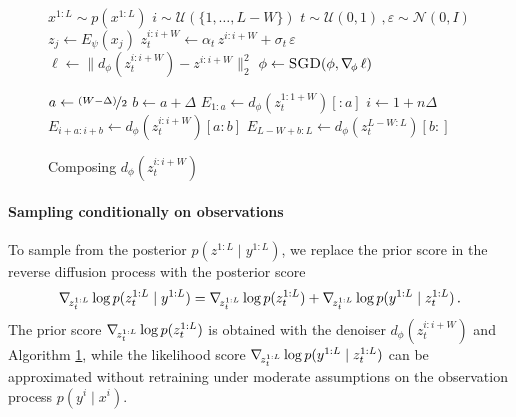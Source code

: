 \begin{figure}[b]
\begin{minipage}[t]{0.49\textwidth}%
\vspace{-1em}
\begin{algorithm}[H]
    \caption{Training $d_\phi(z^{i:i+W}_t)$} \label{alg:appa-training}
    \begin{algorithmic}[1]
            \State $x^{1:L} \sim p(x^{1:L})$
            \State $i \sim \mathcal{U}(\{1, \dots, L-W\})$
            \State $t \sim \mathcal{U}(0, 1) \, , \varepsilon \sim \mathcal{N}(0, I)$
                \State $z_j \gets E_\psi(x_j)$
            \EndFor{}
            \State $z^{i:i+W}_t \gets \alpha_t \, z^{i:i+W} + \sigma_t \, \varepsilon$
            \State $\displaystyle \ell \gets \big\| d_\phi(z^{i:i+W}_t) - z^{i:i+W} \big\|^2_2$
            \State $\phi \gets \Call{SGD}{\phi, \grad{\phi} \, \ell}$
        \EndFor{}
	\end{algorithmic}
\end{algorithm}
\end{minipage}%
\hfill%
\begin{minipage}[t]{0.49\textwidth}%
\vspace{-1em}
\begin{algorithm}[H]
    \caption{Composing $d_\phi(z^{i:i+W}_t)$} \label{alg:appa-composing}
    \begin{algorithmic}[1]
            \State $a \gets \nicefrac{(W - \Delta)}{2}$
            \State $b \gets a + \Delta$
            \State $E_{1:a} \gets d_\phi(z^{1:1+W}_t)[:\!a]$
                \State $i \gets 1 + n \Delta$
                \State $E_{i+a:i+b} \gets d_\phi(z^{i:i+W}_t)[a\!:\!b]$
            \EndFor{}
            \State $E_{L-W+b:L} \gets d_\phi(z^{L-W:L}_t)[b\!:]$
            \State {}
        \EndFunction{}
	\end{algorithmic}
\end{algorithm}
\end{minipage}
\end{figure}

\paragraph{Sampling conditionally on observations}
To sample from the posterior $p(z^{1:L} \mid y^{1:L})$, we replace the prior score in the reverse diffusion process with the posterior score
\begin{equation} \label{eq:score-bayes}
    \nabla_{\!{z^{1:L}_t}} \log p(z^{1:L}_t \mid y^{1:L}) = \nabla_{\!{z^{1:L}_t}} \log p(z^{1:L}_t) + \nabla_{\!{z^{1:L}_t}} \log p(y^{1:L} \mid z^{1:L}_t) \, .
\end{equation}
The prior score $\nabla_{\!{z^{1:L}_t}} \log p(z^{1:L}_t)$ is obtained with the denoiser $d_\phi(z^{i:i+W}_t)$ and Algorithm \ref{alg:appa-composing}, while the likelihood score $\nabla_{\!{z^{1:L}_t}} \log p(y^{1:L} \mid z^{1:L}_t)$ can be approximated \cite{chung2023diffusion, rozet2023scorebased, rozet2024learning, daras2024survey} without retraining under moderate assumptions on the observation process $p(y^i \mid x^i)$.

